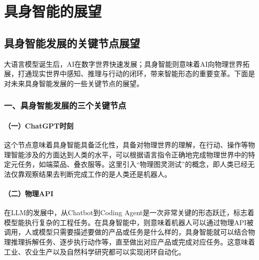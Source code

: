 \hypertarget{ux5177ux8eabux667aux80fdux7684ux5c55ux671b}{%
\chapter{具身智能的展望}\label{ux5177ux8eabux667aux80fdux7684ux5c55ux671b}}

\hypertarget{ux5177ux8eabux667aux80fdux53d1ux5c55ux7684ux5173ux952eux8282ux70b9ux5c55ux671b}{%
\section{具身智能发展的关键节点展望}\label{ux5177ux8eabux667aux80fdux53d1ux5c55ux7684ux5173ux952eux8282ux70b9ux5c55ux671b}}

大语言模型诞生后，AI在数字世界快速发展；具身智能则意味着AI向物理世界拓展，打通现实世界中感知、推理与行动的闭环，带来智能形态的重要变革。下面是对未来具身智能发展的一些关键节点的展望。

\hypertarget{ux4e00ux5177ux8eabux667aux80fdux53d1ux5c55ux7684ux4e09ux4e2aux5173ux952eux8282ux70b9}{%
\subsection{一、具身智能发展的三个关键节点}\label{ux4e00ux5177ux8eabux667aux80fdux53d1ux5c55ux7684ux4e09ux4e2aux5173ux952eux8282ux70b9}}

\hypertarget{ux4e00chatgptux65f6ux523b}{%
\subsubsection{（一）ChatGPT时刻}\label{ux4e00chatgptux65f6ux523b}}

这个节点意味着具身智能具备泛化性，具备对物理世界的理解，在行动、操作等物理智能涉及的方面达到人类的水平，可以根据语言指令正确地完成物理世界中的特定元任务，如端菜品、叠衣服等。这里引入``物理图灵测试''的概念，即人类已经无法仅靠观察结果去判断完成工作的是人类还是机器人。

\hypertarget{ux4e8cux7269ux7406api}{%
\subsubsection{（二）物理API}\label{ux4e8cux7269ux7406api}}

在LLM的发展中，从Chatbot到Coding Agent是一次非常关键的形态跃迁，标志着模型能执行复杂的工程任务。在具身智能中，则意味着机器人可以通过物理API被调用，人或模型只需要描述要做的产品或任务是什么样的，具身智能就可以结合物理推理拆解任务、逐步执行动作等，直至做出对应产品或完成对应任务。这意味着工业、农业生产以及自然科学研究都可以实现闭环自动化。

